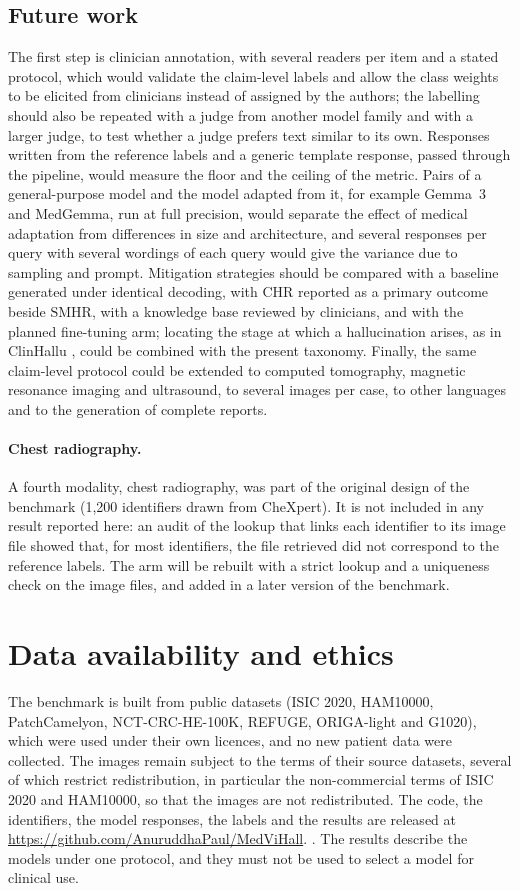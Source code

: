 \documentclass[11pt,a4paper]{article}
\newif\ifshowtags
\newcommand{\TODO}[1]{\ifshowtags{\textcolor{BrickRed}{[TODO: #1]}}\else\PackageWarning{main}{Unresolved TODO: #1}\fi}
\newcommand{\SMHR}{\ensuremath{\mathrm{SMHR}}}
\newcommand{\CHR}{\ensuremath{\mathrm{CHR}}}
\begin{document}
\subsection{Future work}
The first step is clinician annotation, with several readers per item and a stated protocol, which would validate the claim-level labels and allow the class weights to be elicited from clinicians instead of assigned by the authors; the labelling should also be repeated with a judge from another model family and with a larger judge, to test whether a judge prefers text similar to its own. Responses written from the reference labels and a generic template response, passed through the pipeline, would measure the floor and the ceiling of the metric. Pairs of a general-purpose model and the model adapted from it, for example Gemma~3 and MedGemma, run at full precision, would separate the effect of medical adaptation from differences in size and architecture, and several responses per query with several wordings of each query would give the variance due to sampling and prompt. Mitigation strategies should be compared with a baseline generated under identical decoding, with \CHR{} reported as a primary outcome beside \SMHR{}, with a knowledge base reviewed by clinicians, and with the planned fine-tuning arm; locating the stage at which a hallucination arises, as in ClinHallu \citep{yang2026clinhallu}, could be combined with the present taxonomy. Finally, the same claim-level protocol could be extended to computed tomography, magnetic resonance imaging and ultrasound, to several images per case, to other languages and to the generation of complete reports.

\paragraph{Chest radiography.} A fourth modality, chest radiography, was part of the original design of the benchmark (1{,}200 identifiers drawn from CheXpert). It is not included in any result reported here: an audit of the lookup that links each identifier to its image file showed that, for most identifiers, the file retrieved did not correspond to the reference labels. The arm will be rebuilt with a strict lookup and a uniqueness check on the image files, and added in a later version of the benchmark.

\section*{Data availability and ethics}
The benchmark is built from public datasets (ISIC 2020, HAM10000, PatchCamelyon, NCT-CRC-HE-100K, REFUGE, ORIGA-light and G1020), which were used under their own licences, and no new patient data were collected. The images remain subject to the terms of their source datasets, several of which restrict redistribution, in particular the non-commercial terms of ISIC 2020 and HAM10000, so that the images are not redistributed. The code, the identifiers, the model responses, the labels and the results are released at \url{https://github.com/AnuruddhaPaul/MedViHall}. \TODO{state the position on ethical review}. The results describe the models under one protocol, and they must not be used to select a model for clinical use.
\end{document}
